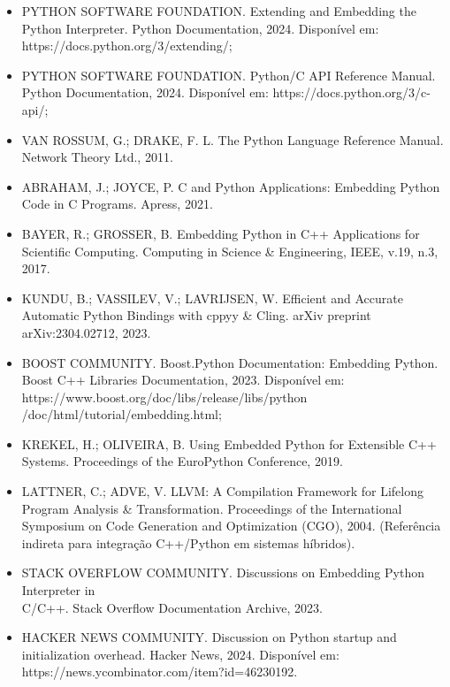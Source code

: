 \begin{itemize}
   \item PYTHON SOFTWARE FOUNDATION. Extending and Embedding the Python Interpreter. Python Documentation, 2024. Disponível em: https://docs.python.org/3/extending/;

   \item PYTHON SOFTWARE FOUNDATION. Python/C API Reference Manual. Python Documentation, 2024. Disponível em: https://docs.python.org/3/c-api/;

   \item VAN ROSSUM, G.; DRAKE, F. L. The Python Language Reference Manual. Network Theory Ltd., 2011.

   \item ABRAHAM, J.; JOYCE, P. C and Python Applications: Embedding Python Code in C Programs. Apress, 2021.

   \item BAYER, R.; GROSSER, B. Embedding Python in C++ Applications for Scientific Computing. Computing in Science \& Engineering, IEEE, v.19, n.3, 2017.

   \item KUNDU, B.; VASSILEV, V.; LAVRIJSEN, W. Efficient and Accurate Automatic Python Bindings with cppyy \& Cling. arXiv preprint arXiv:2304.02712, 2023.

   \item BOOST COMMUNITY. Boost.Python Documentation: Embedding Python. Boost C++ Libraries Documentation, 2023. Disponível em: https://www.boost.org/doc/libs/release/libs/python\\/doc/html/tutorial/embedding.html;

   \item KREKEL, H.; OLIVEIRA, B. Using Embedded Python for Extensible C++ Systems. Proceedings of the EuroPython Conference, 2019.

   \item LATTNER, C.; ADVE, V. LLVM: A Compilation Framework for Lifelong Program Analysis \& Transformation. Proceedings of the International Symposium on Code Generation and Optimization (CGO), 2004. (Referência indireta para integração C++/Python em sistemas híbridos).

   \item STACK OVERFLOW COMMUNITY. Discussions on Embedding Python Interpreter in \\C/C++. Stack Overflow Documentation Archive, 2023.

   \item HACKER NEWS COMMUNITY. Discussion on Python startup and initialization overhead. Hacker News, 2024. Disponível em: https://news.ycombinator.com/item?id=46230192.
    

\end{itemize}
